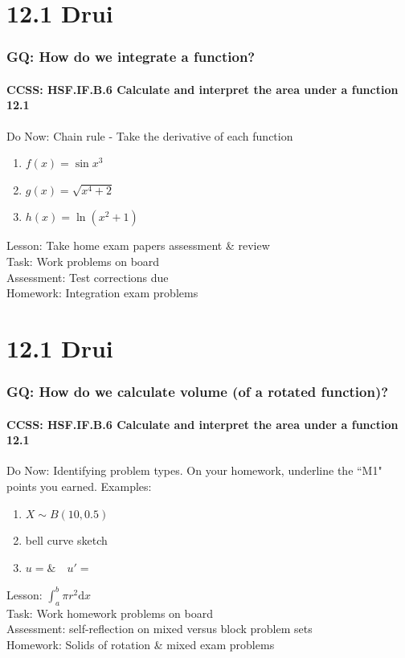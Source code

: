 \documentclass{beamer}
\begin{document}
  \section{12.1 Drui}
  \frame
  {
    \frametitle{GQ: How do we integrate a function?}
    \framesubtitle{CCSS: HSF.IF.B.6 Calculate and interpret the area under a function \qquad \alert{12.1}}

    \begin{block}{Do Now: Chain rule - Take the derivative of each function}
      \begin{enumerate}
      \item $f(x)=\sin{x^3}$
      \item $g(x)=\sqrt{x^4+2}$
      \item $h(x)=\ln{(x^2+1)}$
      \end{enumerate}
   \end{block}
    Lesson: Take home exam papers assessment \& review\\%
    Task: Work problems on board\\%
    Assessment: Test corrections due\\%
    Homework: Integration exam problems
  }

  \section{12.1 Drui}
  \frame
  {
    \frametitle{GQ: How do we calculate volume (of a rotated function)?}
    \framesubtitle{CCSS: HSF.IF.B.6 Calculate and interpret the area under a function \qquad \alert{12.1}}

    \begin{block}{Do Now: Identifying problem types. On your homework, underline the ``M1" points you earned. Examples:}
      \begin{enumerate}
      \item $X \sim B(10, 0.5)$
      \item bell curve sketch
      \item $u= \& \quad u'=$
      \end{enumerate}
   \end{block}
    Lesson: $\displaystyle \int_a^b \pi r^2 \text{d}x$\\%
    Task: Work homework problems on board\\%
    Assessment: self-reflection on mixed versus block problem sets\\%
    Homework: Solids of rotation \& mixed exam problems
  }
\end{document}
